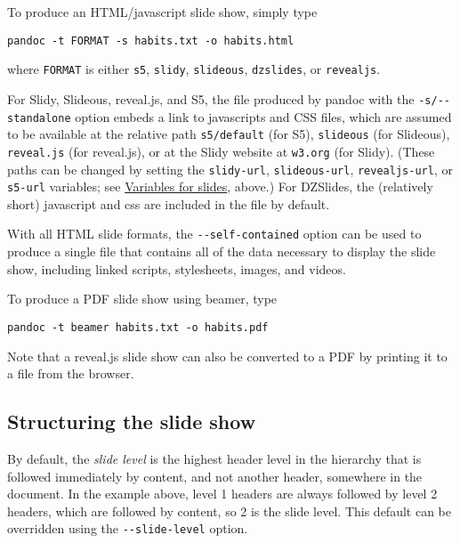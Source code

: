 \documentclass[]{article}
\begin{document}
To produce an HTML/javascript slide show, simply type

\begin{verbatim}
pandoc -t FORMAT -s habits.txt -o habits.html
\end{verbatim}

where \texttt{FORMAT} is either \texttt{s5}, \texttt{slidy},
\texttt{slideous}, \texttt{dzslides}, or \texttt{revealjs}.

For Slidy, Slideous, reveal.js, and S5, the file produced by pandoc with
the \texttt{-s/-\/-standalone} option embeds a link to javascripts and
CSS files, which are assumed to be available at the relative path
\texttt{s5/default} (for S5), \texttt{slideous} (for Slideous),
\texttt{reveal.js} (for reveal.js), or at the Slidy website at
\texttt{w3.org} (for Slidy). (These paths can be changed by setting the
\texttt{slidy-url}, \texttt{slideous-url}, \texttt{revealjs-url}, or
\texttt{s5-url} variables; see
\protect\hyperlink{variables-for-slides}{Variables for slides}, above.)
For DZSlides, the (relatively short) javascript and css are included in
the file by default.

With all HTML slide formats, the \texttt{-\/-self-contained} option can
be used to produce a single file that contains all of the data necessary
to display the slide show, including linked scripts, stylesheets,
images, and videos.

To produce a PDF slide show using beamer, type

\begin{verbatim}
pandoc -t beamer habits.txt -o habits.pdf
\end{verbatim}

Note that a reveal.js slide show can also be converted to a PDF by
printing it to a file from the browser.

\hypertarget{structuring-the-slide-show}{\subsection{Structuring the
slide show}\label{structuring-the-slide-show}}

By default, the \emph{slide level} is the highest header level in the
hierarchy that is followed immediately by content, and not another
header, somewhere in the document. In the example above, level 1 headers
are always followed by level 2 headers, which are followed by content,
so 2 is the slide level. This default can be overridden using the
\texttt{-\/-slide-level} option.
\end{document}
